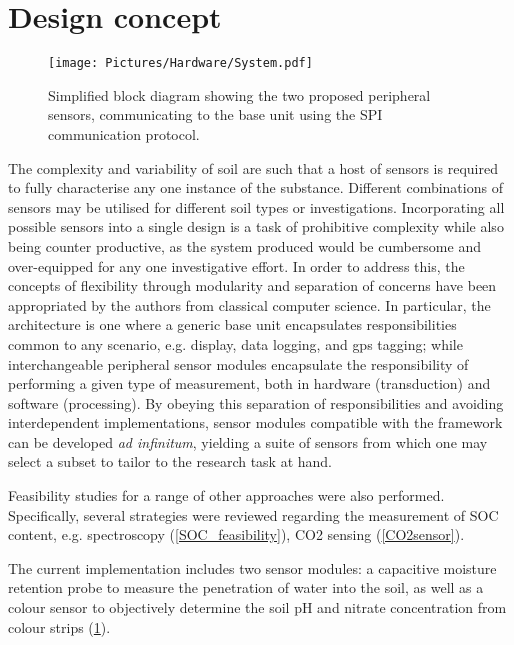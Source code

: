 \section{Design concept}

	    \begin{figure}[ht]
		    \centering
		    \texttt{[image: Pictures/Hardware/System.pdf]}
		    \captionsetup {justification = centering}
			\caption{Simplified block diagram showing the two proposed peripheral sensors, communicating to the base unit using the \gls{SPI} communication protocol.}
			\label{fig:JM_System}
    	\end{figure}
	    

The complexity and variability of soil are such that a host of sensors is required to fully characterise any one instance of the substance. Different combinations of sensors may be utilised for different soil types or investigations. Incorporating all possible sensors into a single design is a task of prohibitive complexity while also being counter productive, as the system produced would be cumbersome and over-equipped for any one investigative effort. In order to address this, the concepts of flexibility through modularity and separation of concerns have been appropriated by the authors from classical computer science. In particular, the  architecture is one where a generic base unit encapsulates responsibilities common to any scenario, e.g. display, data logging, and \gls{gps} tagging; while interchangeable peripheral sensor modules encapsulate the responsibility of performing a given type of measurement, both in hardware (transduction) and software (processing). By obeying this separation of responsibilities and avoiding interdependent implementations, sensor modules compatible with the framework can be developed \textit{ad infinitum}, yielding a suite of sensors from which one may select a subset to tailor to the research task at hand. 

 Feasibility studies for a range of other approaches were also performed. Specifically, several strategies were reviewed regarding the measurement of \gls{SOC} content, e.g. spectroscopy (\cref{SOC_feasibility}), \gls{CO2} sensing (\cref{CO2sensor}).

The current implementation includes two sensor modules: a capacitive moisture retention probe to measure the penetration of water into the soil, as well as a colour sensor to objectively determine the soil pH and nitrate concentration from colour strips (\cref{fig:JM_System}).

